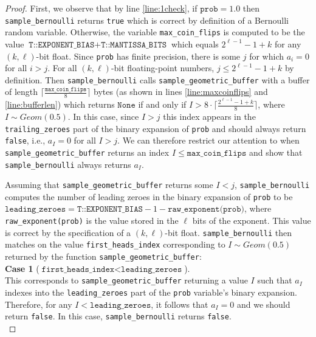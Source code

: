 \documentclass[11pt,a4paper]{article}
\theoremstyle{definition}
\begin{document}
\begin{proof}
First, we observe that by line \ref{line:1check}, if $\texttt{prob} = 1.0$ then \texttt{sample\_bernoulli} returns \texttt{true} which is correct by definition of a Bernoulli random variable. Otherwise, the variable \texttt{max\_coin\_flips} is computed to be the value $\texttt{T::EXPONENT\_BIAS} + \texttt{T::MANTISSA\_BITS}$ which equals $2^{\ell - 1} - 1 + k$ for any $(k,\ell)$-bit float. Since \texttt{prob} has finite precision, there is some $j$ for which $a_i = 0$ for all $i > j$. For all $(k,\ell)$-bit floating-point numbers, $j \le 2^{\ell - 1} - 1 + k$ by definition. Then \texttt{sample\_bernoulli} calls \texttt{sample\_geometric\_buffer} with a buffer of length $\lceil \frac{\texttt{max\_coin\_flips}}{8}\rceil$ bytes (as shown in lines \ref{line:maxcoinflips} and \ref{line:bufferlen}) which returns  $\texttt{None}$ if and only if $I > {8\cdot \lceil \frac{2^{\ell - 1} -1 + k}{8}\rceil}$, where $I \sim Geom(0.5)$. In this case, since $I > j$ this index appears in the \texttt{trailing\_zeroes} part of the binary expansion of \texttt{prob} and should always return \texttt{false}, i.e., $a_I = 0$ for all $I > j$. We can therefore restrict our attention to when \texttt{sample\_geometric\_buffer} returns an index $I \le \texttt{max\_coin\_flips}$ and show that \texttt{sample\_bernoulli} always returns $a_I$. 

Assuming that \texttt{sample\_geometric\_buffer} returns some $I < j$,  \texttt{sample\_bernoulli} computes the number of leading zeroes in the binary expansion of \texttt{prob} to be $\texttt{leading\_zeroes} = \texttt{T::EXPONENT\_BIAS} - 1 - \texttt{raw\_exponent(prob)}$, where \texttt{raw\_exponent(prob)} is the value stored in the $\ell$ bits of the exponent. This value is correct by the specification of a $(k,\ell)$-bit float.  \texttt{sample\_bernoulli} then matches on the value \texttt{first\_heads\_index} corresponding to $I \sim Geom(0.5)$ returned by the function \texttt{sample\_geometric\_buffer}: \\

\noindent\textbf{Case 1} ($\texttt{first\_heads\_index} < \texttt{leading\_zeroes}$). \\
\noindent This corresponds to \texttt{sample\_geometric\_buffer} returning a value $I$ such that $a_I$ indexes into the \texttt{leading\_zeroes} part of the  \texttt{prob} variable's binary expansion. Therefore, for any $I < \texttt{leading\_zeroes}$, it follows that $a_I = 0$ and we should return \texttt{false}. In this case, \texttt{sample\_bernoulli} returns \texttt{false}.\\


\end{proof}
\end{document}
